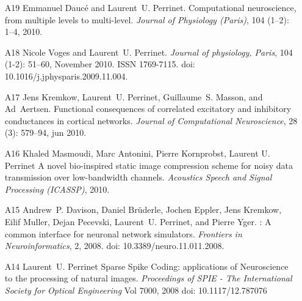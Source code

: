 \documentclass[11pt,french,a4paper,oneside]{article}%
\newcommand{\years}[1]{\marginpar{\textit{\scriptsize #1}}}
\providecommand{\doi}[1]{doi: #1}%
\begin{document}
\begin{enumerate}
\item[A19] %
Emmanuel Dauc{\'e} and Laurent~U. Perrinet.
\newblock Computational neuroscience, from multiple levels to multi-level.
\newblock \emph{Journal of {P}hysiology ({P}aris)}, 104
  (1--2): 1--4, 2010.

\item[A18] %
Nicole Voges and Laurent~U. Perrinet.
\newblock \emph{Journal of physiology, Paris}, 104 (1-2):
  51--60, November 2010.
\newblock ISSN 1769-7115.
\newblock \doi{10.1016/j.jphysparis.2009.11.004}.

\item[A17] %
Jens Kremkow, Laurent~U. Perrinet, Guillaume~S. Masson, and Ad~Aertsen.
\newblock Functional consequences of correlated excitatory and inhibitory
  conductances in cortical networks.
\newblock \emph{Journal of {C}omputational {N}euroscience}, 28
  (3): 579--94, jun 2010.

\item[A16] %
Khaled Masmoudi, Marc Antonini, Pierre Kornprobst, Laurent U. Perrinet
\newblock A novel bio-inspired static image compression scheme for noisy data transmission over low-bandwidth channels.
\newblock \emph{Acoustics Speech and Signal Processing (ICASSP)}, 2010.

\item[A15] %
Andrew~P. Davison, \years{2008} Daniel Br\"{u}derle, Jochen Eppler, Jens Kremkow, Eilif  Muller, Dejan Pecevski, Laurent~U. Perrinet, and Pierre Yger.
: A common interface for neuronal network simulators.
\newblock \emph{Frontiers in Neuroinformatics}, 2, 2008.
\newblock \doi{10.3389/neuro.11.011.2008}.


\item[A14] %
Laurent~U. Perrinet
\newblock Sparse Spike Coding: applications of Neuroscience to the processing of natural images.
\newblock \emph{Proceedings of SPIE - The International Society for Optical Engineering} Vol 7000, 2008
\newblock \doi{10.1117/12.787076}


\end{enumerate}
\end{document}

